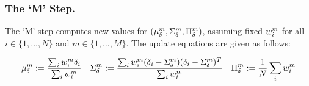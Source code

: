 \subsubsection{The `M' Step.}
The `M' step computes new values for $(\mu_{\delta}^{m},\Sigma_{\delta}^{m},\Pi_{\delta}^{m})$, assuming fixed $w_{i}^{m}$ for all $i \in \{1,\dots,N\}$ and $m \in \{1,\dots,M\}$. The update equations are given as follows:

\begin{equation}
    \mu_{\delta}^{m} := 
    \frac{
        \sum_{i} w_{i}^{m}\delta_{i}
    }
    {
        \sum_{i} w_{i}^{m}
    }
    \quad
    \Sigma_{\delta}^{m} :=
    \frac{
        \sum_{i} 
        w_{i}^{m}
        (\delta_{i} - \Sigma_{\delta}^{m})
        (\delta_{i} - \Sigma_{\delta}^{m})^{T}
    }
    {
        \sum_{i}w_{i}^{m}
    }
    \quad
    \Pi_{\delta}^{m} :=
    \frac{1}{N}\sum_{i} w_{i}^{m}
\end{equation}
